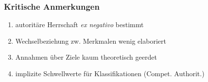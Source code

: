\documentclass{beamer}
\begin{document}
\begin{frame}
  \frametitle{Kritische Anmerkungen}
  \begin{enumerate}
    \item autoritäre Herrschaft \textit{ex negativo} bestimmt
    \item Wechselbeziehung zw. Merkmalen wenig elaboriert
    \item Annahmen über Ziele kaum theoretisch geerdet
    \item implizite Schwellwerte für Klassifikationen (Compet. Authorit.)
  \end{enumerate}
\end{frame}
\end{document}
